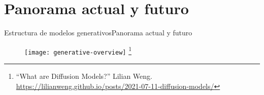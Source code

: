\documentclass[10pt,border=3pt,tikz]{beamer}
\begin{document}
    \section{Panorama actual y futuro}
    
    \begin{frame}{Estructura de modelos generativos}{Panorama actual y futuro}
        \begin{figure}
            \centering
            \texttt{[image: generative-overview]}
            \let\thefootnote\relax\footnote{{\tiny “What are Diffusion Models?” Lilian Weng. \url{https://lilianweng.github.io/posts/2021-07-11-diffusion-models/}}}
        \end{figure}
    \end{frame}
	
\end{document}
